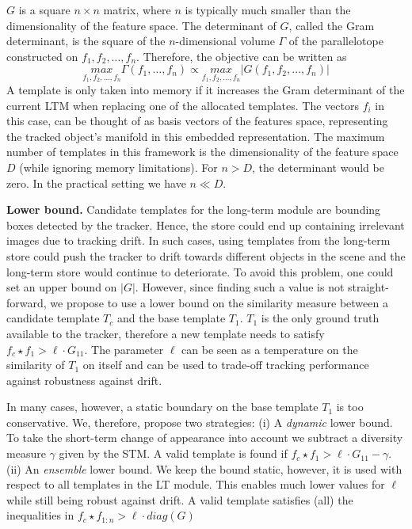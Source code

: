 \documentclass{article}
\begin{document}
$G$ is a square $n\times n$ matrix, where $n$ is typically much smaller than the dimensionality of the feature space. The determinant of $G$, called the Gram determinant, is the square of the $n$-dimensional volume $\Gamma$ of the parallelotope constructed on $f_1, f_2, \dots, f_n$. Therefore, the objective can be written as
\begin{equation}
\underset{f_1,f_2, \dots, f_n}{max} \Gamma(f_1,\dots,f_n) \propto \underset{f_1,f_2, \dots, f_n}{max} |G(f_1,f_2, \dots, f_n)|
\end{equation}
A template is only taken into memory if it increases the Gram determinant of the current LTM when replacing one of the allocated templates. The vectors $f_i$ in this case, can be thought of as basis vectors of the features space, representing the tracked object's manifold in this embedded representation. The maximum number of templates in this framework is the dimensionality of the feature space $D$ (while ignoring memory limitations). For $n > D$, the determinant would be zero. In the practical setting we have  $n \ll D$.

\textbf{Lower bound.}
Candidate templates for the long-term module are bounding boxes detected by the tracker. Hence, the store could end up containing irrelevant images due to tracking drift. In such cases, using templates from the long-term store could push the tracker to drift towards different objects in the scene and the long-term store would continue to deteriorate. To avoid this problem, one could set an upper bound on $|G|$. However, since finding such a value is not straight-forward, we propose to use a lower bound on the similarity measure between a candidate template $T_c$ and the base template $T_1$. $T_1$ is the only ground truth available to the tracker, therefore a new template needs to satisfy $f_c \star f_1 >  \ell \cdot G_{11}$. The parameter $\ell$ can be seen as a temperature on the similarity of $T_1$ on itself and can be used to trade-off tracking performance against robustness against drift. 

In many cases, however, a static boundary on the base template $T_1$ is too conservative. We, therefore, propose two strategies: (i) A \textit{dynamic} lower bound. To take the short-term change of appearance into account we subtract a diversity measure $\gamma$ given by the STM. A valid template is found if $f_c \star f_1 >  \ell \cdot G_{11}  - \gamma$. (ii) An \textit{ensemble} lower bound. We keep the bound static, however, it is used with respect to all templates in the LT module. This enables much lower values for $\ell$ while still being robust against drift. A valid template satisfies (all) the inequalities in $f_c \star f_{1:n} > \ell \cdot diag(G)$
\end{document}
